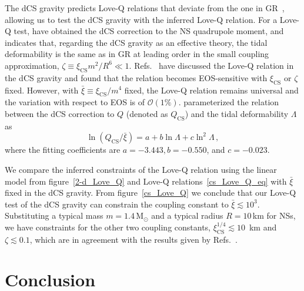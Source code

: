 \documentclass[a4paper,11pt]{article}
\begin{document}
The dCS gravity predicts Love-Q relations that deviate from the one in
GR~\cite{Yagi:2013bca, Yagi:2013awa, Gupta:2017vsl}, allowing us to test the dCS
gravity with the inferred Love-Q relation.  For a Love-Q test,
\citet{Yagi:2013mbt} have obtained the dCS correction to the NS quadrupole
moment, and \citet{Yagi:2011xp} indicates that, regarding the dCS gravity as an
effective theory, the tidal deformability is the same as  in GR at leading order
in the small coupling approximation, $\zeta \equiv \xi_{\mathrm{CS}} m^2/R^6 \ll
1$. Refs.~\cite{Yagi_2017, Yagi:2013mbt, Gupta:2017vsl} have discussed the
Love-Q relation in the dCS gravity and found that the relation becomes
EOS-sensitive with $\xi_{\mathrm{CS}}$ or $\zeta$ fixed. However, with 
$\bar{\xi}\equiv \xi_{\mathrm{CS}}/m^4$ fixed, the Love-Q relation remains 
universal and the  variation with respect to EOS is of $\mathcal{O}(1\%)$.
\citet{Gupta:2017vsl} parameterized the relation between the dCS correction to
$Q$ (denoted as $Q_{\mathrm{CS}}$) and the tidal deformability $\Lambda$ as
\begin{equation}
    \label{cs_Love_Q_eq}
    \ln (Q_{\mathrm{CS}}/\bar{\xi}) = a + b \ln \Lambda + c \ln^{2} \Lambda \,,
\end{equation} 
where the fitting coefficients are $a=-3.443, b=-0.550$, and $c=-0.023$. 

We compare the inferred constraints of the Love-Q relation using the linear
model from figure~\ref{2-d_Love_Q} and Love-Q relations~\eqref{cs_Love_Q_eq}
with $\bar{\xi}$ fixed in the dCS gravity. From figure~\ref{cs_Love_Q} we
conclude that our Love-Q test of the dCS gravity can constrain the coupling
constant to  $\bar{\xi} \lesssim 10^{3}$. Substituting a typical mass
$m=1.4\,\mathrm{M_{\odot}}$ and a typical radius $R=10$\,km for NSs, we have
constraints for the other two coupling constants, $\xi_{\mathrm{CS}}^{1/4}
\lesssim 10$~km and $\zeta \lesssim 0.1$, which are in agreement with the
results given by Refs.~\cite{Yagi:2013bca, Yagi:2013awa}. 

\section{Conclusion}
\label{sec:conclusion}
\end{document}
